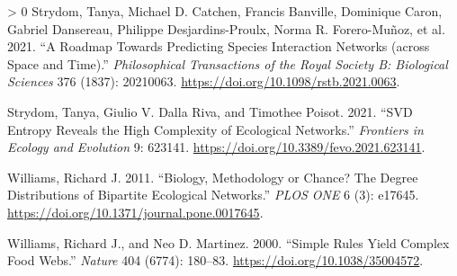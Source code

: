 \documentclass[10pt,oneside]{article}
\newlength{\cslhangindent}
\newenvironment{CSLReferences}[3] %
 {%
  \setlength{\parindent}{0pt}
  \ifodd #1 \everypar{\setlength{\hangindent}{\cslhangindent}}\ignorespaces\fi
  \ifnum #2 > 0
  \setlength{\parskip}{#2\baselineskip}
  \fi
 }%
 {}
\begin{document}
\begin{CSLReferences}{1}{0}
\leavevmode\hypertarget{ref-Strydom2021RoaPre}{}%
Strydom, Tanya, Michael D. Catchen, Francis Banville, Dominique Caron,
Gabriel Dansereau, Philippe Desjardins-Proulx, Norma R. Forero-Muñoz, et
al. 2021. {``A Roadmap Towards Predicting Species Interaction Networks
(across Space and Time).''} \emph{Philosophical Transactions of the
Royal Society B: Biological Sciences} 376 (1837): 20210063.
\url{https://doi.org/10.1098/rstb.2021.0063}.

\leavevmode\hypertarget{ref-Strydom2021SvdEnt}{}%
Strydom, Tanya, Giulio V. Dalla Riva, and Timothee Poisot. 2021. {``SVD
Entropy Reveals the High Complexity of Ecological Networks.''}
\emph{Frontiers in Ecology and Evolution} 9: 623141.
\url{https://doi.org/10.3389/fevo.2021.623141}.

\leavevmode\hypertarget{ref-Williams2011BioMet}{}%
Williams, Richard J. 2011. {``Biology, Methodology or Chance? The Degree
Distributions of Bipartite Ecological Networks.''} \emph{PLOS ONE} 6
(3): e17645. \url{https://doi.org/10.1371/journal.pone.0017645}.

\leavevmode\hypertarget{ref-Williams2000SimRul}{}%
Williams, Richard J., and Neo D. Martinez. 2000. {``Simple Rules Yield
Complex Food Webs.''} \emph{Nature} 404 (6774): 180--83.
\url{https://doi.org/10.1038/35004572}.

\end{CSLReferences}
\end{document}
